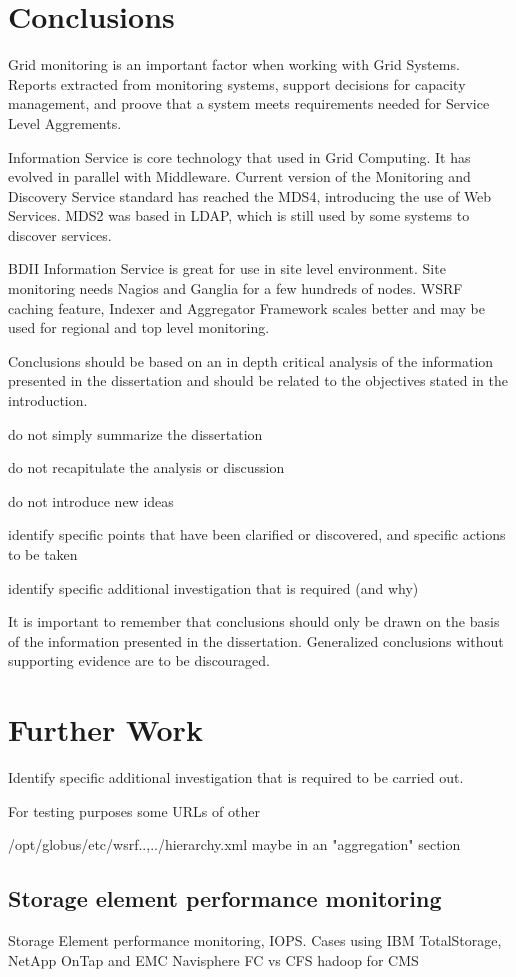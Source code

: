 \section{Conclusions}

Grid monitoring is an important factor when working with Grid Systems. Reports extracted from monitoring systems, support decisions for capacity management, and proove that a system meets requirements needed for Service Level Aggrements.

Information Service is core technology that used in Grid Computing. It has evolved in parallel with Middleware. Current version of the Monitoring and Discovery Service standard has reached the MDS4, introducing the use of Web Services. MDS2 was based in LDAP, which is still used by some systems to discover services.

BDII Information Service is great for use in site level environment. Site monitoring needs Nagios and Ganglia for a few hundreds of nodes. WSRF caching feature, Indexer and Aggregator Framework scales better and may be used for regional and top level monitoring.



Conclusions should be based on an in depth critical analysis of the information presented in the dissertation and should be related to the objectives stated in the introduction.

do not simply summarize the dissertation

do not recapitulate the analysis or discussion

do not introduce new ideas

identify specific points that have been clarified or discovered, and specific actions to be taken

identify specific additional investigation that is required (and why)

It is important to remember that conclusions should only be drawn on the basis of the information presented in the dissertation. Generalized conclusions without supporting evidence are to be
discouraged.

\section{Further Work}
Identify specific additional investigation that is required to be carried out.

For testing purposes some URLs of other 

/opt/globus/etc/wsrf..,../hierarchy.xml maybe in an "aggregation" section

\subsection{Storage element performance monitoring}
Storage Element performance monitoring, IOPS. Cases using IBM TotalStorage, NetApp OnTap and EMC Navisphere
FC vs CFS \cite{brzezniak2008analysis}
hadoop for CMS \cite{hadoop}

